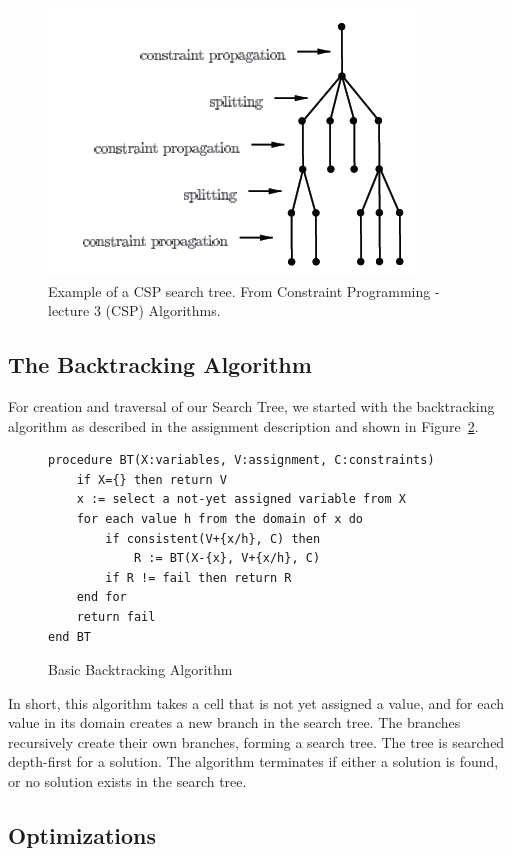 \documentclass[11pt]{article} %
\begin{document}
\begin{figure}[htbp]
\begin{center}
\includegraphics{tree.png}
\caption{Example of a CSP search tree. From Constraint Programming - lecture 3 (CSP) Algorithms. }
\label{fig:basic_tree}
\end{center}
\end{figure}

\subsection{The Backtracking Algorithm}

For creation and traversal of our Search Tree, we started with the backtracking algorithm as described in the assignment description and shown in Figure~\ref{code:BT}.

\begin{figure}
\begin{verbatim}
procedure BT(X:variables, V:assignment, C:constraints)
    if X={} then return V
    x := select a not-yet assigned variable from X
    for each value h from the domain of x do
        if consistent(V+{x/h}, C) then
            R := BT(X-{x}, V+{x/h}, C)
        if R != fail then return R
    end for
    return fail
end BT
\end{verbatim}
\caption{Basic Backtracking Algorithm}
\label{code:BT}
\end{figure}

In short, this algorithm takes a cell that is not yet assigned a value, and for each value in its domain creates a new branch in the search tree. The branches recursively create their own branches, forming a search tree. The tree is searched depth-first for a solution. The algorithm terminates if either a solution is found, or no solution exists in the search tree.

\subsection{Optimizations}
\end{document}
